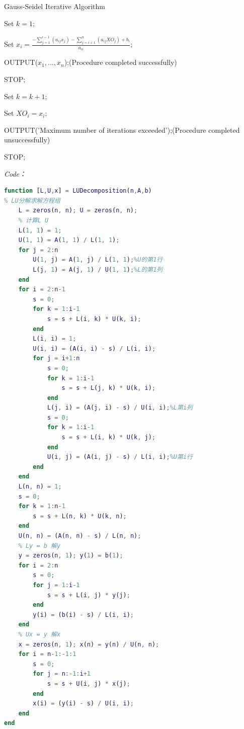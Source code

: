 \documentclass[12pt]{ctexart}
\begin{document}
	\begin{algorithm}
		\caption{Gauss-Seidel Iterative Algorithm}
		Set $k=1;$
		
		{
			{
				Set $x_i=\frac{-\sum\limits_{j=1}^{i-1}(a_{ij}x_j)-\sum\limits_{j=i+1}^{n}(a_{ij}XO_j)+b_i}{a_{ii}};$
			}
			
			{
				OUTPUT($x_1,\dots,x_n$);(Procedure completed successfully)
				
				STOP;
			}
			
			Set $k=k+1;$
			
			{
				Set $XO_i=x_i;$
			}
		}
		
		OUTPUT('Maximum number of iterations exceeded');(Procedure completed unsuccessfully)
		
		STOP;
	\end{algorithm}
	
	\textit{Code：}
	
\begin{lstlisting}[language = MATLAB]
function [L,U,x] = LUDecomposition(n,A,b)
% LU分解求解方程组
	L = zeros(n, n); U = zeros(n, n);
	% 计算L U
	L(1, 1) = 1;
	U(1, 1) = A(1, 1) / L(1, 1);
	for j = 2:n
		U(1, j) = A(1, j) / L(1, 1);%U的第1行
		L(j, 1) = A(j, 1) / U(1, 1);%L的第1列
	end
	for i = 2:n-1
		s = 0;
		for k = 1:i-1
			s = s + L(i, k) * U(k, i);
		end
		L(i, i) = 1;
		U(i, i) = (A(i, i) - s) / L(i, i);
		for j = i+1:n
			s = 0;
			for k = 1:i-1
				s = s + L(j, k) * U(k, i);
			end
			L(j, i) = (A(j, i) - s) / U(i, i);%L第i列
			s = 0;
			for k = 1:i-1
				s = s + L(i, k) * U(k, j);
			end
			U(i, j) = (A(i, j) - s) / L(i, i);%U第i行
		end
	end
	L(n, n) = 1;
	s = 0;
	for k = 1:n-1
		s = s + L(n, k) * U(k, n);
	end
	U(n, n) = (A(n, n) - s) / L(n, n);
	% Ly = b 解y
	y = zeros(n, 1); y(1) = b(1);
	for i = 2:n
		s = 0;
		for j = 1:i-1
			s = s + L(i, j) * y(j);
		end
		y(i) = (b(i) - s) / L(i, i);
	end
	% Ux = y 解x
	x = zeros(n, 1); x(n) = y(n) / U(n, n);
	for i = n-1:-1:1
		s = 0;
		for j = n:-1:i+1
			s = s + U(i, j) * x(j);
		end
		x(i) = (y(i) - s) / U(i, i);
	end
end
\end{lstlisting}
	
\end{document}
